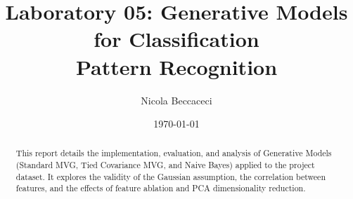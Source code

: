 \documentclass[12pt, a4paper]{article}
\title{Laboratory 05: Generative Models for Classification\\ \Large Pattern Recognition}
\author{Nicola Beccaceci}
\date{\today}
\begin{document}
\maketitle

\begin{abstract}
This report details the implementation, evaluation, and analysis of Generative Models (Standard MVG, Tied Covariance MVG, and Naive Bayes) applied to the project dataset. It explores the validity of the Gaussian assumption, the correlation between features, and the effects of feature ablation and PCA dimensionality reduction.
\end{abstract}

\tableofcontents
\newpage



\newpage



\newpage



\newpage


\end{document}
